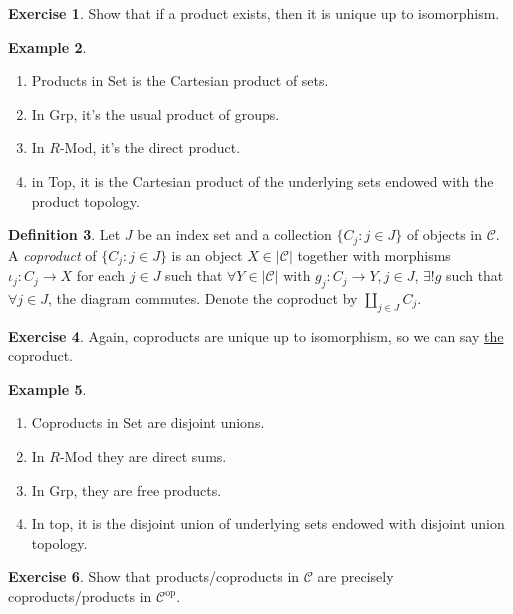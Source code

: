 \documentclass{article}
\newcommand{\op}{{\operatorname{op}}}
\newcommand{\ca}{\mathcal{C}}
\theoremstyle{definition}
\newtheorem{defn}{Definition}[subsection]
\newtheorem{example}[defn]{Example}
\newtheorem{exe}[defn]{Exercise}
\begin{document}
\begin{exe}
Show that if a product exists, then it is unique up to isomorphism.
\end{exe}

\begin{example}
\begin{enumerate}
\item Products in Set is the Cartesian product of sets.
\item In Grp, it's the usual product of groups.
\item In $R$-Mod, it's the direct product.
\item in Top, it is the Cartesian product of the underlying sets endowed with the product topology.
\end{enumerate}
\end{example}

\begin{defn}
Let $J$ be an index set and a collection $\{C_j:j\in J\}$ of objects in $\ca$. A \textit{coproduct} of $\{C_j:j\in J\}$ is an object $X\in|\ca|$ together with morphisms $\iota_j:C_j\rightarrow X$ for each $j\in J$ such that $\forall Y\in|\ca|$ with $g_j:C_j\rightarrow Y,j\in J$, $\exists! g$ such that $\forall j\in J$, the diagram  commutes. Denote the coproduct by $\coprod_{j\in J}C_j$.
\end{defn}

\begin{exe}
Again, coproducts are unique up to isomorphism, so we can say \underline{the} coproduct.
\end{exe}

\begin{example}
\begin{enumerate}
\item Coproducts in Set are disjoint unions.
\item In $R$-Mod they are direct sums.
\item In Grp, they are free products.
\item In top, it is the disjoint union of underlying sets endowed with disjoint union topology.
\end{enumerate}
\end{example}

\begin{exe}
Show that products/coproducts in $\ca$ are precisely coproducts/products in $\ca^\op$.
\end{exe}
\end{document}
